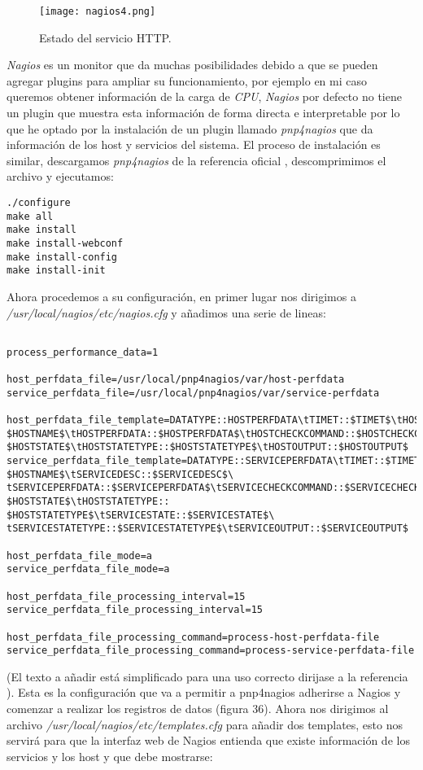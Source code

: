 \documentclass[a4paper, 11pt]{article} %
\begin{document}
\begin{figure}[H]
\centering 
\texttt{[image: nagios4.png]} 
\caption{Estado del servicio HTTP.} 
\label{contexto:figura} 
\end{figure}
\textit{Nagios} es un monitor que da muchas posibilidades debido a que se pueden agregar plugins para ampliar su funcionamiento, por ejemplo en mi caso queremos obtener información de la carga de \textit{CPU}, \textit{Nagios} por defecto no tiene un plugin que muestra esta información de forma directa e interpretable por lo que he optado por la instalación de un plugin llamado \textit{pnp4nagios} que da información de los host y servicios del sistema. El proceso de instalación es similar, descargamos \textit{pnp4nagios} de la referencia oficial \cite{16}, descomprimimos el archivo y ejecutamos:
\begin{verbatim}
./configure
make all
make install
make install-webconf
make install-config
make install-init
\end{verbatim}
Ahora procedemos a su configuración, en primer lugar nos dirigimos a \textit{/usr/local/nagios/etc/nagios.cfg} y añadimos una serie de lineas:
\begin{verbatim}

process_performance_data=1

host_perfdata_file=/usr/local/pnp4nagios/var/host-perfdata
service_perfdata_file=/usr/local/pnp4nagios/var/service-perfdata

host_perfdata_file_template=DATATYPE::HOSTPERFDATA\tTIMET::$TIMET$\tHOSTNAME::
$HOSTNAME$\tHOSTPERFDATA::$HOSTPERFDATA$\tHOSTCHECKCOMMAND::$HOSTCHECKCOMMAND$\tHOSTSTATE::
$HOSTSTATE$\tHOSTSTATETYPE::$HOSTSTATETYPE$\tHOSTOUTPUT::$HOSTOUTPUT$
service_perfdata_file_template=DATATYPE::SERVICEPERFDATA\tTIMET::$TIMET$\tHOSTNAME::
$HOSTNAME$\tSERVICEDESC::$SERVICEDESC$\
tSERVICEPERFDATA::$SERVICEPERFDATA$\tSERVICECHECKCOMMAND::$SERVICECHECKCOMMAND$\tHOSTSTATE::
$HOSTSTATE$\tHOSTSTATETYPE::
$HOSTSTATETYPE$\tSERVICESTATE::$SERVICESTATE$\
tSERVICESTATETYPE::$SERVICESTATETYPE$\tSERVICEOUTPUT::$SERVICEOUTPUT$

host_perfdata_file_mode=a
service_perfdata_file_mode=a

host_perfdata_file_processing_interval=15
service_perfdata_file_processing_interval=15

host_perfdata_file_processing_command=process-host-perfdata-file
service_perfdata_file_processing_command=process-service-perfdata-file
\end{verbatim}
(El texto a añadir está simplificado para una uso correcto dirijase a la referencia \cite{17}). Esta es la configuración que va a permitir a pnp4nagios adherirse a Nagios y comenzar a realizar los registros de datos (figura 36). Ahora nos dirigimos al archivo \textit{/usr/local/nagios/etc/templates.cfg} para añadir dos templates, esto nos servirá para que la interfaz web de Nagios entienda que existe información de los servicios y los host y que debe mostrarse:
\end{document}
